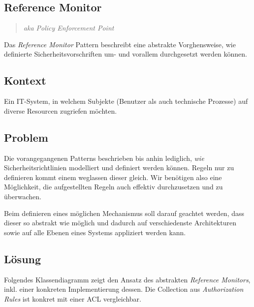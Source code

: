 \subsection{Reference Monitor}

\begin{quote}\emph{aka Policy Enforcement Point}\end{quote}

Das \emph{Reference Monitor} Pattern beschreibt eine abstrakte Vorghensweise, wie definierte Sicherheitsvorschriften um- und vorallem durchgesetzt werden können.

\subsection*{Kontext}
Ein IT-System, in welchem Subjekte (Benutzer als auch technische Prozesse) auf diverse Resourcen zugriefen möchten.

\subsection*{Problem}
Die vorangegangenen Patterns beschrieben bis anhin lediglich, \emph{wie} Sicherheitsrichtlinien modelliert und definiert werden können.
Regeln nur zu definieren kommt einem weglassen dieser gleich. Wir benötigen also eine Möglichkeit, die aufgestellten Regeln auch effektiv durchzusetzen und zu überwachen.

Beim definieren eines möglichen Mechanismus soll darauf geachtet werden, dass dieser so abstrakt wie möglich und dadurch auf verschiedenste Architekturen sowie auf alle Ebenen eines Systems appliziert werden kann.

\subsection*{Lösung}
Folgendes Klassendiagramm zeigt den Ansatz des abstrakten \emph{Reference Monitors}, inkl. einer konkreten Implementierung dessen.
Die Collection aus \emph{Authorization Rules} ist konkret mit einer \gls{ACL} vergleichbar.

